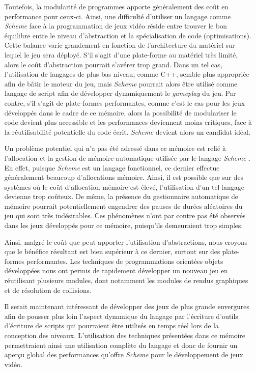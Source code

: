 \documentclass[12pt,twoside,letterpaper,francais]{book}
\newcommand{\Schemelang}{{\textit{Scheme }}}
\begin{document}
Toutefois, la modularité de programmes apporte généralement des coût
en performance pour ceux-ci. Ainsi, une difficulté d'utiliser un
langage comme \Schemelang face à la programmation de jeux vidéo réside
entre trouver le bon équilibre entre le niveau d'abstraction et la
spécialisation de code (optimisations). Cette balance varie grandement
en fonction de l'architecture du matériel sur lequel le jeu sera
déployé. S'il s'agit d'une plate-forme au matériel très limité, alors
le coût d'abstraction pourrait s'avérer trop grand. Dans un tel cas,
l'utilisation de langages de plus bas niveau, comme C++, semble plus
appropriée afin de bâtir le moteur du jeu, mais \Schemelang pourrait
alors être utilisé comme langage de script afin de développer
dynamiquement le \textit{gameplay} du jeu. Par contre, s'il s'agit de
plate-formes performantes, comme c'est le cas pour les jeux développés
dans le cadre de ce mémoire, alors la possibilité de modulariser le
code devient plus accessible et les performances deviennent moins
critiques, face à la réutilisabilité potentielle du code
écrit. \Schemelang devient alors un candidat idéal.

Un problème potentiel qui n'a pas été adressé dans ce mémoire est
relié à l'allocation et la gestion de mémoire automatique utilisée par
le langage \Schemelang. En effet, puisque \Schemelang est un langage
fonctionnel, ce dernier effectue généralement beaucoup d'allocations
mémoire. Ainsi, il est possible que sur des systèmes où le coût
d'allocation mémoire est élevé, l'utilisation d'un tel langage
devienne trop coûteux. De même, la présence du gestionnaire
automatique de mémoire pourrait potentiellement engendrer des pauses
de durées aléatoires du jeu qui sont très indésirables. Ces phénomènes
n'ont par contre pas été observés dans les jeux développés pour ce
mémoire, puisqu'ils demeuraient trop simples.

Ainsi, malgré le coût que peut apporter l'utilisation d'abstractions,
nous croyons que le bénéfice résultant est bien supérieur à ce
dernier, surtout sur des plate-formes performantes. Les techniques de
programmations orientées objets développées nous ont permis de
rapidement développer un nouveau jeu en réutilisant plusieurs
modules, dont notamment les modules de rendus graphiques et de
résolution de collisions.

Il serait maintenant intéressant de développer des jeux de plus grande
envergures afin de pousser plus loin l'aspect dynamique du langage par
l'écriture d'outils d'écriture de scripts qui pourraient être utilisés
en temps réel lors de la conception des niveaux. L'utilisation des
techniques présentées dans ce mémoire permettraient ainsi une
utilisation complète du langage et donc de fournir un aperçu global
des performances qu'offre \Schemelang pour le développement de jeux
vidéo.



\singlespacing


\appendix
\end{document}
